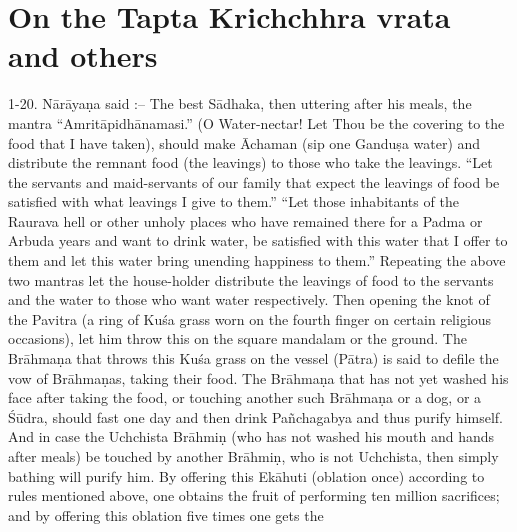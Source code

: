 \chapter{On the Tapta Krichchhra vrata and others}

1-20. N\=ar\=aya\d{n}a said :-- The best S\=adhaka, then uttering after his meals, the mantra ``Amrit\=apidh\=anamasi.'' (O Water-nectar! Let Thou be the covering to the food that I have taken), should make \=Achaman (sip one Gandu\d{s}a water) and distribute the remnant food (the leavings) to those who take the leavings. ``Let the servants and maid-servants of our family that expect the leavings of food be satisfied with what leavings I give to them.'' ``Let those inhabitants of the Raurava hell or other unholy places who have remained there for a Padma or Arbuda years and want to drink water, be satisfied with this water that I offer to them and let this water bring unending happiness to them.'' Repeating the above two mantras let the house-holder distribute the leavings of food to the servants and the water to those who want water respectively. Then opening the knot of the Pavitra (a ring of Ku\'sa grass worn on the fourth finger on certain religious occasions), let him throw this on the square mandalam or the ground. The Br\=ahma\d{n}a that throws this Ku\'sa grass on the vessel (P\=atra) is said to defile the vow of Br\=ahma\d{n}as, taking their food. The Br\=ahma\d{n}a that has not yet washed his face after taking the food, or touching another such Br\=ahma\d{n}a or a dog, or a \'S\=udra, should fast one day and then drink Pa\~nchagabya and thus purify himself. And in case the Uchchista Br\=ahmi\d{n} (who has not washed his mouth and hands after meals) be touched by another Br\=ahmi\d{n}, who is not Uchchista, then simply bathing will purify him. By offering this Ek\=ahuti (oblation once) according to rules mentioned above, one obtains the fruit of performing ten million sacrifices; and by offering this oblation five times one gets the

